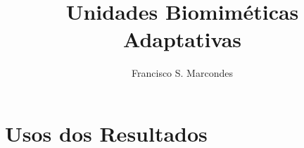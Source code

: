 \documentclass[12pt,graybox,envcountchap,sectrefs]{svmono}
\title{Unidades Biomiméticas Adaptativas}
\author{Francisco S. Marcondes}
\newcommand{\geralPasta}{../geral}
\newcommand{\fraPasta}{../fra}
\begin{document}
\maketitle

\tableofcontents








	\chapter{Usos dos Resultados}
	\label{cap:resultados}
	
	





\backmatter

	
	

    
	
	\printindex
\end{document}
